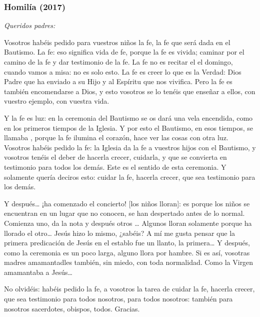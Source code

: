 		\subsubsection{Homilía (2017)}
		
			
			\begin{body}
				\emph{Queridos padres:}
				
				Vosotros habéis pedido para vuestros niños la fe, la fe que será dada en el Bautismo. La fe: eso significa vida de fe, porque la fe es vivida; caminar por el camino de la fe y dar testimonio de la fe. La fe no es recitar el  el domingo, cuando vamos a misa: no es solo esto. La fe es creer lo que es la Verdad: Dios Padre que ha enviado a su Hijo y al Espíritu que nos vivifica. Pero la fe es también encomendarse a Dios, y esto vosotros se lo tenéis que enseñar a ellos, con vuestro ejemplo, con vuestra vida.
				
				Y la fe es luz: en la ceremonia del Bautismo se os dará una vela encendida, como en los primeros tiempos de la Iglesia. Y por esto el Bautismo, en esos tiempos, se llamaba , porque la fe ilumina el corazón, hace ver las cosas con otra luz. Vosotros habéis pedido la fe: la Iglesia da la fe a vuestros hijos con el Bautismo, y vosotros tenéis el deber de hacerla crecer, cuidarla, y que se convierta en testimonio para todos los demás. Este es el sentido de esta ceremonia. Y solamente quería deciros esto: cuidar la fe, hacerla crecer, que sea testimonio para los demás.
				
				Y después\ldots{} ¡ha comenzado el concierto! {[}los niños lloran{]}: es porque los niños se encuentran en un lugar que no conocen, se han despertado antes de lo normal. Comienza uno, da la nota y después otros \ldots{} Algunos lloran solamente porque ha llorado el otro\ldots{} Jesús hizo lo mismo, ¿sabéis? A mí me gusta pensar que la primera predicación de Jesús en el establo fue un llanto, la primera\ldots{} Y después, como la ceremonia es un poco larga, alguno llora por hambre. Si es así, vosotras madres amamantadles también, sin miedo, con toda normalidad. Como la Virgen amamantaba a Jesús\ldots{}
				
				No olvidéis: habéis pedido la fe, a vosotros la tarea de cuidar la fe, hacerla crecer, que sea testimonio para todos nosotros, para todos nosotros: también para nosotros sacerdotes, obispos, todos. Gracias.
			\end{body}
		
